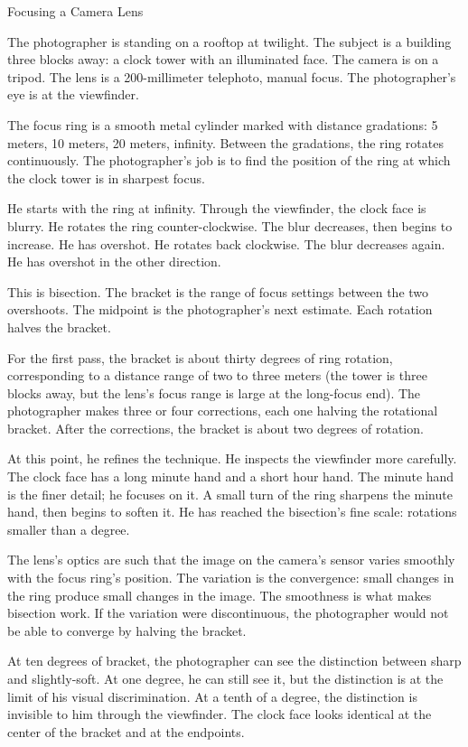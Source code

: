 \begin{coda}{Focusing a Camera Lens}

The photographer is standing on a rooftop at twilight. The subject is
a building three blocks away: a clock tower with an illuminated face.
The camera is on a tripod. The lens is a 200-millimeter telephoto,
manual focus. The photographer's eye is at the viewfinder.

The focus ring is a smooth metal cylinder marked with distance
gradations: 5 meters, 10 meters, 20 meters, infinity. Between the
gradations, the ring rotates continuously. The photographer's job
is to find the position of the ring at which the clock tower is in
sharpest focus.

He starts with the ring at infinity. Through the viewfinder, the
clock face is blurry. He rotates the ring counter-clockwise. The
blur decreases, then begins to increase. He has overshot. He
rotates back clockwise. The blur decreases again. He has
overshot in the other direction.

This is bisection. The bracket is the range of focus settings
between the two overshoots. The midpoint is the photographer's
next estimate. Each rotation halves the bracket.

For the first pass, the bracket is about thirty degrees of ring
rotation, corresponding to a distance range of two to three
meters (the tower is three blocks away, but the lens's focus
range is large at the long-focus end). The photographer makes
three or four corrections, each one halving the rotational
bracket. After the corrections, the bracket is about two degrees
of rotation.

At this point, he refines the technique. He inspects the
viewfinder more carefully. The clock face has a long minute
hand and a short hour hand. The minute hand is the finer detail;
he focuses on it. A small turn of the ring sharpens the minute
hand, then begins to soften it. He has reached the bisection's
fine scale: rotations smaller than a degree.

The lens's optics are such that the image on the camera's sensor
varies smoothly with the focus ring's position. The variation is
the convergence: small changes in the ring produce small changes
in the image. The smoothness is what makes bisection work. If
the variation were discontinuous, the photographer would not be
able to converge by halving the bracket.

At ten degrees of bracket, the photographer can see the
distinction between sharp and slightly-soft. At one degree, he
can still see it, but the distinction is at the limit of his
visual discrimination. At a tenth of a degree, the distinction
is invisible to him through the viewfinder. The clock face
looks identical at the center of the bracket and at the
endpoints.


\end{coda}
